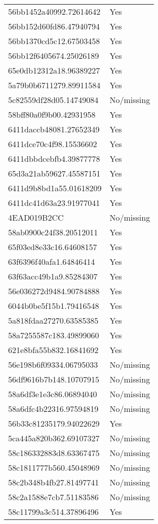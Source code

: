 \begin{tabular}{ll}
56bb1452a40992.72614642 & Yes \\
56bb152d60fd86.47940794 & Yes \\
56bb1370cd5c12.67503458 & Yes \\
56bb12f6405674.25026189 & Yes \\
65e0db12312a18.96389227 & Yes \\
5a79b0b6711279.89911584 & Yes \\
5c82559df28d05.14749084 & No/missing \\
58bff80a0f9b00.42931958 & Yes \\
6411daccb48081.27652349 & Yes \\
6411dce70c4f98.15536602 & Yes \\
6411dbbdcebfb4.39877778 & Yes \\
65d3a21ab59627.45587151 & Yes \\
6411d9b8bd1a55.01618209 & Yes \\
6411dc41d63a23.91977041 & Yes \\
4EAD019B2CC & No/missing \\
58ab0900c24f38.20512011 & Yes \\
65f03ed8e33c16.64608157 & Yes \\
63f6396f40afa1.64846414 & Yes \\
63f63acc49b1a9.85284307 & Yes \\
56e036272d9484.90784888 & Yes \\
6044b0be5f15b1.79416548 & Yes \\
5a818fdaa27270.63585385 & Yes \\
58a7255587c183.49899060 & Yes \\
621e8bfa55b832.16841692 & Yes \\
56e198b6f09334.06795033 & No/missing \\
56df9616b7b148.10707915 & No/missing \\
58a6df3e1e3c86.06894040 & No/missing \\
58a6dfc4b22316.97594819 & No/missing \\
56b33c81235179.94022629 & Yes \\
5ca445a820b362.69107327 & No/missing \\
58c186332883d8.63367475 & No/missing \\
58c1811777b560.45048969 & No/missing \\
58c2b348b4fb27.81497741 & No/missing \\
58c2a1588e7cb7.51183586 & No/missing \\
58c11799a3c514.37896496 & Yes \\

\end{tabular}
